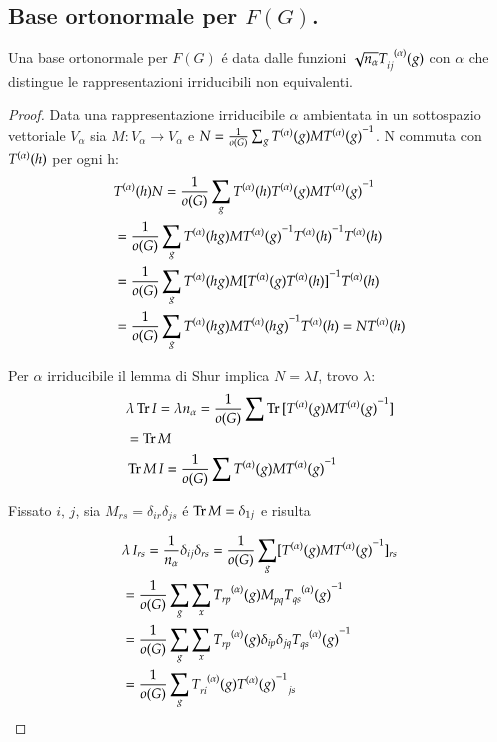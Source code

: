 \documentclass[oneside,12pt]{memoir}
\begin{document}
\subsection{Base ortonormale per $F(G)$.}

Una base ortonormale per $F(G)$ \'e data dalle funzioni $\sqrt{n_{\alpha}}T\indices{_i_j^{(\alpha)}}(g)$ con $\alpha$ che distingue le rappresentazioni irriducibili non equivalenti.

\begin{proof}
Data una rappresentazione irriducibile $\alpha$ ambientata in un sottospazio vettoriale $V_{\alpha}$ sia $M:V_{\alpha}\to V_{\alpha}$ e $N=\frac{1}{o(G)}\sum_gT\indices{^{(\alpha)}}(g)M\invers{T\indices{^{(\alpha)}}(g)}$. N commuta con $T\indices{^{(\alpha)}}(h)$ per ogni h:
\begin{align*}
&T\indices{^{(\alpha)}}(h)N=\frac{1}{o(G)}\sum_gT\indices{^{(\alpha)}}(h)T\indices{^{(\alpha)}}(g)M\invers{T\indices{^{(\alpha)}}(g)}\\
&=\frac{1}{o(G)}\sum_gT\indices{^{(\alpha)}}(hg)M\invers{T\indices{^{(\alpha)}}(g)}\invers{T\indices{^{(\alpha)}}(h)}T\indices{^{(\alpha)}}(h)\\
&=\frac{1}{o(G)}\sum_gT\indices{^{(\alpha)}}(hg)M\invers{[T\indices{^{(\alpha)}}(g)T\indices{^{(\alpha)}}(h)]}T\indices{^{(\alpha)}}(h)\\
&=\frac{1}{o(G)}\sum_gT\indices{^{(\alpha)}}(hg)M\invers{T\indices{^{(\alpha)}}(hg)}T\indices{^{(\alpha)}}(h)=NT\indices{^{(\alpha)}}(h)
\end{align*}

Per $\alpha$ irriducibile il lemma di Shur implica $N=\lambda I$, trovo $\lambda$:
\begin{align*}
&\lambda\Tr{I}=\lambda n_{\alpha}=\frac{1}{o(G)}\sum\Tr{[T\indices{^{(\alpha)}}(g)M\invers{T\indices{^{(\alpha)}}(g)}]}\\
&=\Tr{M}\\
&\Tr{M}\,I=\frac{1}{o(G)}\sum T\indices{^{(\alpha)}}(g)M\invers{T\indices{^{(\alpha)}}(g)}
\end{align*}

Fissato $i,\,j$, sia $M_{rs}=\delta_{ir}\delta_{js}$ \'e $\operatorname{Tr}{M}=\delta_{1j}$ e risulta

\begin{align*}
&\lambda\,I_{rs}=\frac{1}{n_{\alpha}}\delta_{ij}\delta_{rs}=\frac{1}{o(G)}\sum_g[T\indices{^{(\alpha)}}(g)M\invers{T\indices{^{(\alpha)}}(g)}]_{rs}\\
&=\frac{1}{o(G)}\sum_g\sum_{x}T\indices{_r_p^{(\alpha)}}(g)M\indices{_p_q}\invers{T\indices{_q_s^{(\alpha)}}(g)}\\
&=\frac{1}{o(G)}\sum_g\sum_{x}T\indices{_r_p^{(\alpha)}}(g)\delta_{ip}\delta_{jq}\invers{T\indices{_q_s^{(\alpha)}}(g)}\\
&=\frac{1}{o(G)}\sum_gT\indices{_r_i^{(\alpha)}}(g)\invers{T\indices{^{(\alpha)}}(g)}\indices{_j_s}
\end{align*}


\end{proof}
\end{document}
